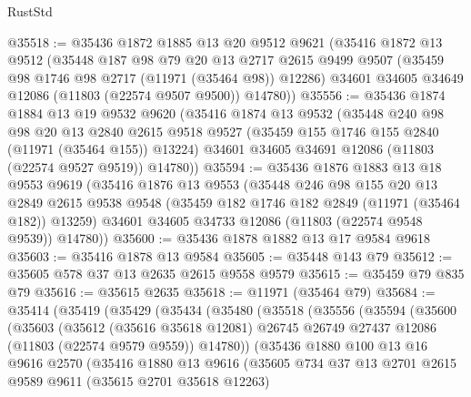 \begin{lexlean}{RustStd}
\begin{coremodule}
@35518 := @35436
    @1872
    @1885
    @13
    @20
    @9512
    @9621
    (@35416
      @1872
      @13
      @9512
      (@35448
        @187
        @98
        @79
        @20
        @13
        @2717
        @2615
        @9499
        @9507
        (@35459 @98 @1746 @98 @2717 (@11971 (@35464 @98)) @12286)
        @34601
        @34605
        @34649
        @12086
        (@11803 (@22574 @9507 @9500))
        @14780))
@35556 := @35436
    @1874
    @1884
    @13
    @19
    @9532
    @9620
    (@35416
      @1874
      @13
      @9532
      (@35448
        @240
        @98
        @98
        @20
        @13
        @2840
        @2615
        @9518
        @9527
        (@35459 @155 @1746 @155 @2840 (@11971 (@35464 @155)) @13224)
        @34601
        @34605
        @34691
        @12086
        (@11803 (@22574 @9527 @9519))
        @14780))
@35594 := @35436
    @1876
    @1883
    @13
    @18
    @9553
    @9619
    (@35416
      @1876
      @13
      @9553
      (@35448
        @246
        @98
        @155
        @20
        @13
        @2849
        @2615
        @9538
        @9548
        (@35459 @182 @1746 @182 @2849 (@11971 (@35464 @182)) @13259)
        @34601
        @34605
        @34733
        @12086
        (@11803 (@22574 @9548 @9539))
        @14780))
@35600 := @35436 @1878 @1882 @13 @17 @9584 @9618
@35603 := @35416 @1878 @13 @9584
@35605 := @35448 @143 @79
@35612 := @35605 @578 @37 @13 @2635 @2615 @9558 @9579
@35615 := @35459 @79 @835 @79
@35616 := @35615 @2635
@35618 := @11971 (@35464 @79)
@35684 := @35414
    (@35419
      (@35429
        (@35434
          (@35480
            (@35518
              (@35556
                (@35594
                  (@35600
                    (@35603
                      (@35612
                        (@35616 @35618 @12081)
                        @26745
                        @26749
                        @27437
                        @12086
                        (@11803 (@22574 @9579 @9559))
                        @14780))
                    (@35436
                      @1880
                      @100
                      @13
                      @16
                      @9616
                      @2570
                      (@35416
                        @1880
                        @13
                        @9616
                        (@35605
                          @734
                          @37
                          @13
                          @2701
                          @2615
                          @9589
                          @9611
                          (@35615 @2701 @35618 @12263)

\end{coremodule}
\end{lexlean}
